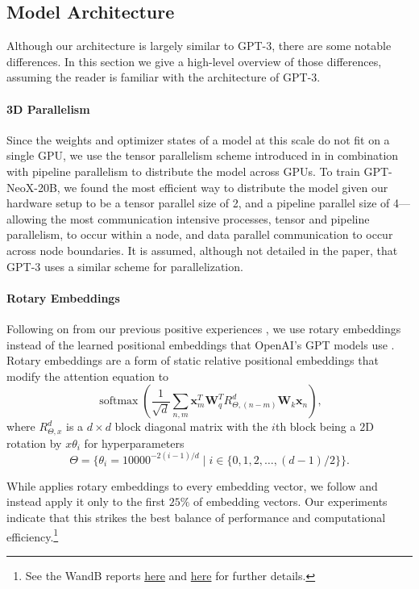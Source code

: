 \documentclass{article}
\newcommand{\model}{GPT-NeoX-20B}
\DeclareMathOperator{\softmax}{softmax}
\begin{document}
\subsection{Model Architecture}
\label{sec:model-arch}

Although our architecture is largely similar to GPT-3, there are some notable differences. In this section we give a high-level overview of those differences, assuming the reader is familiar with the architecture of GPT-3. 

\paragraph{3D Parallelism} Since the weights and optimizer states of a model at this scale do not fit on a single GPU, we use the tensor parallelism scheme introduced in \citet{shoeybi2019megatron} in combination with pipeline parallelism to distribute the model across GPUs. To train \model{}, we found the most efficient way to distribute the model given our hardware setup to be a tensor parallel size of 2, and a pipeline parallel size of 4---allowing the most communication intensive processes, tensor and pipeline parallelism, to occur within a node, and data parallel communication to occur across node boundaries. It is assumed, although not detailed in the paper, that GPT-3 uses a similar scheme for parallelization.

\paragraph{Rotary Embeddings} Following on from our previous positive experiences \citep{rope-eleutherai,rope-experiments,gpt-j}, we use rotary embeddings \citep{su2021roformer} instead of the learned positional embeddings that OpenAI's GPT models use \citep{radford2018improving}. Rotary embeddings are a form of static relative positional embeddings that modify the attention equation to
$$\softmax\left(\frac{1}{\sqrt{d}}\sum_{n,m}\mathbf{x}_m^T\mathbf{W}^T_qR^{d}_{\Theta,(n-m)}\mathbf{W}_k\mathbf{x}_n\right),$$
where $R^d_{\Theta,x}$ is a $d\times d$ block diagonal matrix with the $i$th block being a $2$D rotation by $x\theta_i$ for hyperparameters $$\Theta = \{\theta_i = 10000^{-2(i-1)/d}\;\vert\;i\in\{0,1,2,\ldots, (d-1)/2\}\}.$$

While \citet{su2021roformer} applies rotary embeddings to every embedding vector, we follow \citet{gpt-j} and instead apply it only to the first $25\%$ of embedding vectors. Our experiments indicate that this strikes the best balance of performance and computational efficiency.\footnote{See the WandB reports \href{https://wandb.ai/eleutherai/neox/reports/Partial-Rotary-Tests-v2--Vmlldzo2MjE4MTQ}{here} and \href{https://wandb.ai/lucidrains/x-transformers-experiments/reports/partial-rotary--Vmlldzo2MjAyODY?accessToken=f657029yibaln2vseli6egxxwykhpeuedeuvcnmmdgn4i6d5b1r30it3mp0gw0k5}{here} for further details.}
\end{document}
